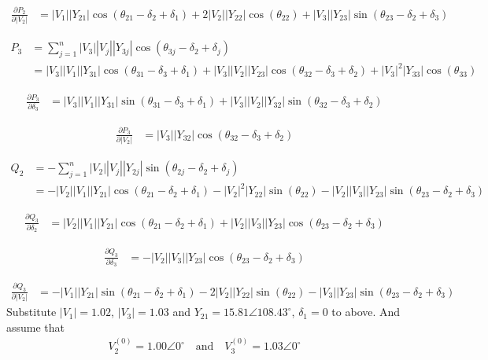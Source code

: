 \documentclass[11pt, oneside, reqno]{amsart}
\numberwithin{equation}{section}
\theoremstyle{plain}%
\theoremstyle{definition}
\theoremstyle{remark}
\begin{document}
\begin{align*}
	\frac{\partial P_2}{\partial |V_2|}&=|V_1||Y_{21}|\cos(\theta_{21}-\delta_2+\delta_1)+2|V_2||Y_{22}|\cos(\theta_{22})
+	|V_3||Y_{23}|\sin(\theta_{23}-\delta_2+\delta_3)
\end{align*}

\begin{align*}
	P_3&=\sum^n_{j=1}|V_3||V_j||Y_{3j}|\cos(\theta_{3j}-\delta_2+\delta_j)\\
	&=|V_3||V_1||Y_{31}|\cos(\theta_{31}-\delta_3+\delta_1)+|V_3||V_2||Y_{23}|\cos(\theta_{32}-\delta_3+\delta_2)+|V_3|^2|Y_{33}|\cos(\theta_{33})
\end{align*}

\begin{align*}
	\frac{\partial P_3}{\partial\delta_3}&=|V_3||V_1||Y_{31}|\sin(\theta_{31}-\delta_3+\delta_1)+|V_3||V_2||Y_{32}|\sin(\theta_{32}-\delta_3+\delta_2)
\end{align*}

\begin{align*}
	\frac{\partial P_3}{\partial |V_2|}&=|V_3||Y_{32}|\cos(\theta_{32}-\delta_3+\delta_2)
\end{align*}

\begin{align*}
	Q_2&=-\sum^n_{j=1}|V_2||V_j||Y_{2j}|\sin(\theta_{2j}-\delta_2+\delta_j)\\
	&=-|V_2||V_1||Y_{21}|\cos(\theta_{21}-\delta_2+\delta_1)-|V_2|^2|Y_{22}|\sin(\theta_{22})-|V_2||V_3||Y_{23}|\sin(\theta_{23}-\delta_2+\delta_3)
\end{align*}

\begin{align*}
	\frac{\partial Q_3}{\partial\delta_2}&=|V_2||V_1||Y_{21}|\cos(\theta_{21}-\delta_2+\delta_1)+|V_2||V_3||Y_{23}|\cos(\theta_{23}-\delta_2+\delta_3)
\end{align*}

\begin{align*}
	\frac{\partial Q_3}{\partial\delta_3}&=-|V_2||V_3||Y_{23}|\cos(\theta_{23}-\delta_2+\delta_3)
\end{align*}

\begin{align*}
		\frac{\partial Q_3}{\partial |V_2|}&=-|V_1||Y_{21}|\sin(\theta_{21}-\delta_2+\delta_1)-2|V_2||Y_{22}|\sin(\theta_{22})
-	|V_3||Y_{23}|\sin(\theta_{23}-\delta_2+\delta_3)
\end{align*}
Substitute $|V_1|=1.02$, $|V_3|=1.03$ and $Y_{21}=15.81\angle 108.43^{\circ}$, $\delta_1=0$ to above. And assume that 
\begin{align}
	V^{(0)}_2=1.00\angle 0^{\circ} \quad\text{and}\quad V^{(0)}_3=1.03\angle 0^{\circ}
\end{align}
\end{document}
